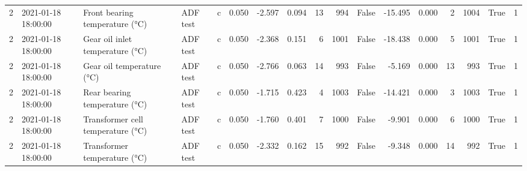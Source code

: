 \begin{tabular}{rllllrrrrrrrrrrrr}
2 & 2021-01-18 18:00:00 & Front bearing temperature (°C) & ADF test & c & 0.050 & -2.597 & 0.094 & 13 & 994 & False & -15.495 & 0.000 & 2 & 1004 & True & 1 \\
2 & 2021-01-18 18:00:00 & Gear oil inlet temperature (°C) & ADF test & c & 0.050 & -2.368 & 0.151 & 6 & 1001 & False & -18.438 & 0.000 & 5 & 1001 & True & 1 \\
2 & 2021-01-18 18:00:00 & Gear oil temperature (°C) & ADF test & c & 0.050 & -2.766 & 0.063 & 14 & 993 & False & -5.169 & 0.000 & 13 & 993 & True & 1 \\
2 & 2021-01-18 18:00:00 & Rear bearing temperature (°C) & ADF test & c & 0.050 & -1.715 & 0.423 & 4 & 1003 & False & -14.421 & 0.000 & 3 & 1003 & True & 1 \\
2 & 2021-01-18 18:00:00 & Transformer cell temperature (°C) & ADF test & c & 0.050 & -1.760 & 0.401 & 7 & 1000 & False & -9.901 & 0.000 & 6 & 1000 & True & 1 \\
2 & 2021-01-18 18:00:00 & Transformer temperature (°C) & ADF test & c & 0.050 & -2.332 & 0.162 & 15 & 992 & False & -9.348 & 0.000 & 14 & 992 & True & 1 \\
\bottomrule
\end{tabular}
